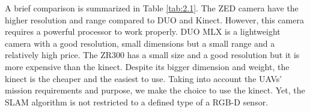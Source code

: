 A brief comparison is summarized in Table \ref{tab:2.1}. The ZED camera have the higher resolution and range compared to DUO and Kinect. However, this camera requires a powerful processor to work properly. DUO MLX is a lightweight camera with a good resolution, small dimensions but a small range and a relatively high price. The ZR300 has a small size and a good resolution but it is more expensive than the kinect. Despite its bigger dimension and weight, the kinect is the cheaper and the easiest to use. Taking into account the UAVs’ mission requirements and purpose, we make the choice to use the kinect. Yet, the SLAM algorithm is not restricted to a deﬁned type of a RGB-D sensor.
\begin{table}[H]
    \caption{RGB-D sensors comparison}
    \label{tab:2.1}
\end{table}
